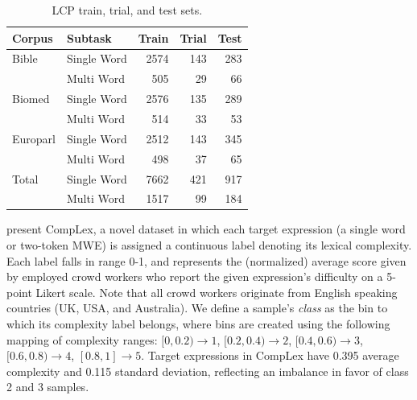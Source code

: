 \documentclass{dcthesis}
\theoremstyle{definition}
\theoremstyle{remark}
\begin{document}
\begin{table}
  \centering
  \begin{tabular}{l|lrrr}
    \hline
    \centering
    \textbf{Corpus} & \textbf{Subtask} & \textbf{Train} &  \textbf{Trial} &  \textbf{Test} \\
    \hline
    Bible & Single Word &   2574 &    143 &   283 \\
            & Multi Word &    505 &     29 &    66 \\
    Biomed & Single Word &   2576 &    135 &   289 \\
            & Multi Word &    514 &     33 &    53 \\
    Europarl & Single Word &   2512 &    143 &   345 \\
            & Multi Word &    498 &     37 &    65 \\
    \hline
    Total & Single Word & 7662 & 421 & 917 \\
          & Multi Word &    1517 &     99 &    184 \\
    \hline
  \end{tabular}
  \caption{\label{tab:datasets} LCP train, trial, and test sets.}
\end{table}

\citet{shardlow2020complex} present CompLex, a novel dataset in which each target expression (a single word or two-token MWE) is assigned a continuous label denoting its lexical complexity. Each label falls in range 0-1, and represents the (normalized) average score given by employed crowd workers who report the given expression's difficulty on a 5-point Likert scale. Note that all crowd workers originate from English speaking countries (UK, USA, and Australia). We define a sample's \textit{class} as the bin to which its complexity label belongs, where bins are created using the following mapping of complexity ranges: $[0,0.2) \rightarrow 1$, $[0.2, 0.4) \rightarrow 2$, $[0.4, 0.6) \rightarrow 3$, $[0.6, 0.8) \rightarrow 4$, $[0.8, 1] \rightarrow 5$. Target expressions in CompLex have 0.395 average complexity and 0.115 standard deviation, reflecting an imbalance in favor of class 2 and 3 samples.
\end{document}
